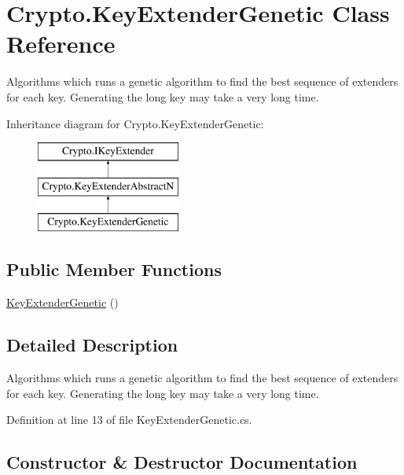 \hypertarget{class_crypto_1_1_key_extender_genetic}{}\section{Crypto.\+Key\+Extender\+Genetic Class Reference}
\label{class_crypto_1_1_key_extender_genetic}


Algorithms which runs a genetic algorithm to find the best sequence of extenders for each key. Generating the long key may take a very long time.  


Inheritance diagram for Crypto.\+Key\+Extender\+Genetic\+:\begin{figure}[H]
\begin{center}
\leavevmode
\includegraphics[height=3.000000cm]{class_crypto_1_1_key_extender_genetic}
\end{center}
\end{figure}
\subsection*{Public Member Functions}
\begin{DoxyCompactItemize}
\item 
\hyperlink{class_crypto_1_1_key_extender_genetic_a60bbe95f9ec44c270006a901acf199e5}{Key\+Extender\+Genetic} ()
\end{DoxyCompactItemize}


\subsection{Detailed Description}
Algorithms which runs a genetic algorithm to find the best sequence of extenders for each key. Generating the long key may take a very long time. 



Definition at line 13 of file Key\+Extender\+Genetic.\+cs.



\subsection{Constructor \& Destructor Documentation}
\hypertarget{class_crypto_1_1_key_extender_genetic_a60bbe95f9ec44c270006a901acf199e5}{}
